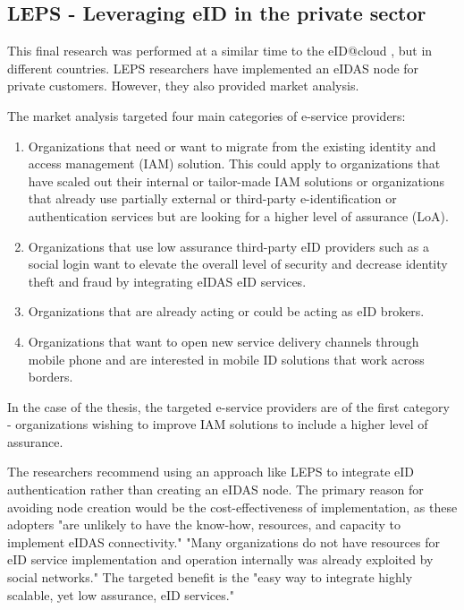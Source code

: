 \subsection{LEPS - Leveraging eID in the private sector}

This final research \cite{Martin2019303} was performed at a similar time to the eID@cloud \cite{guerola2019eid}, but in different countries. LEPS researchers 
have implemented an eIDAS node for private customers. However, they also provided market analysis.

The market analysis targeted four main categories of e-service providers:

\begin{enumerate}
    \item Organizations that need or want to migrate from the existing identity and access management (IAM) solution. This could apply to organizations that have scaled out their internal or tailor-made IAM solutions or organizations that already use partially external or third-party e-identification or authentication services but are looking for a higher level of assurance (LoA).
    \item Organizations that use low assurance third-party eID providers such as a social login want to elevate the overall level of security and decrease identity theft and fraud by integrating eIDAS eID services.
    \item Organizations that are already acting or could be acting as eID brokers.
    \item Organizations that want to open new service delivery channels through mobile phone and are interested in mobile ID solutions that work across borders.
\end{enumerate}

In the case of the thesis, the targeted e-service providers are of the first category - organizations wishing to improve IAM solutions to include a higher level of assurance.

The researchers recommend using an approach like LEPS to integrate eID authentication rather than creating an eIDAS node. The primary reason for avoiding node creation would be the cost-effectiveness of implementation, as these adopters "are unlikely to have the know-how, resources, and capacity to implement eIDAS connectivity." "Many organizations do not have resources for eID service implementation and operation internally was already exploited by social networks." The targeted benefit is the "easy way to integrate highly scalable, yet low assurance, eID services."

